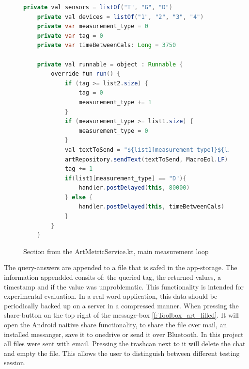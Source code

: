 \begin{figure}[h]
    \centering
    \begin{lstlisting}[language=Java]
    private val sensors = listOf("T", "G", "D")
    private val devices = listOf("1", "2", "3", "4")
    private var measurement_type = 0
    private var tag = 0
    private var timeBetweenCals: Long = 3750

    private val runnable = object : Runnable {
        override fun run() {
            if (tag >= list2.size) {
                tag = 0
                measurement_type += 1
            }
            if (measurement_type >= list1.size) {
                measurement_type = 0
            }
            val textToSend = "${list1[measurement_type]}${list2[tag]}"
            artRepository.sendText(textToSend, MacroEol.LF)
            tag += 1
            if(list1[measurement_type] == "D"){
                handler.postDelayed(this, 80000)
            } else {
                handler.postDelayed(this, timeBetweenCals)
            }
        }
    }
    \end{lstlisting}
    \caption{Section from the ArtMetricService.kt, main measurement loop}
	\label{code:App_main_loop}
\end{figure}


The query-answers are appended to a file that is safed in the app-storage.
The information appendded consits of: the queried tag, the returned values, a timestamp and if the value was unproblematic.
This functionality is intended for experimental evaluation. 
In a real word application, this data should be periodically backed up on a server in a compressed manner.
When pressing the share-button on the top right of the message-box \ref{f:Toolbox_art_filled}.
It will open the Android naitive share functionality, to share the file over mail, an installed messanger, save it to onedrive or send it over Bluetooth.
In this project all files were sent with email.
Pressing the trashcan next to it will delete the chat and empty the file.
This allows the user to distinguish between different testing session.

